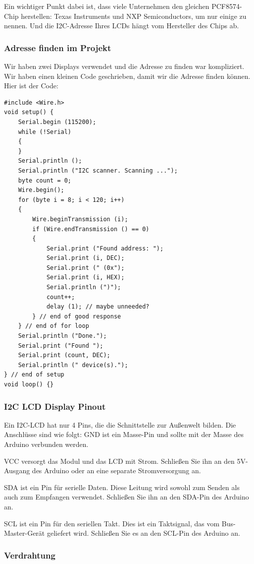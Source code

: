 \documentclass[conference]{IEEEtran}
\begin{document}
Ein wichtiger Punkt dabei ist, dass viele Unternehmen den gleichen PCF8574-Chip herstellen: Texas Instruments und NXP Semiconductors, um nur einige zu nennen. Und die I2C-Adresse Ihres LCDs hängt vom Hersteller des Chips ab.


\subsubsection{Adresse finden im Projekt}
Wir haben zwei  Displays verwendet und die Adresse zu finden war kompliziert.  Wir haben einen kleinen Code geschrieben, damit wir die Adresse finden können. Hier ist der Code: 

\begin{lstlisting}[style=CStyle]
#include <Wire.h>
void setup() {
	Serial.begin (115200);
	while (!Serial)
	{
	}
	Serial.println ();
	Serial.println ("I2C scanner. Scanning ...");
	byte count = 0;
	Wire.begin();
	for (byte i = 8; i < 120; i++)
	{
		Wire.beginTransmission (i);
		if (Wire.endTransmission () == 0)
		{
			Serial.print ("Found address: ");
			Serial.print (i, DEC);
			Serial.print (" (0x");
			Serial.print (i, HEX);
			Serial.println (")");
			count++;
			delay (1); // maybe unneeded?
		} // end of good response
	} // end of for loop
	Serial.println ("Done.");
	Serial.print ("Found ");
	Serial.print (count, DEC);
	Serial.println (" device(s).");
} // end of setup
void loop() {}
\end{lstlisting}\textbf{}

\subsubsection{I2C LCD Display Pinout}

Ein I2C-LCD hat nur 4 Pins, die die Schnittstelle zur Außenwelt bilden. Die Anschlüsse sind wie folgt:
GND ist ein Masse-Pin und sollte mit der Masse des Arduino verbunden werden.

VCC versorgt das Modul und das LCD mit Strom. Schließen Sie ihn an den 5V-Ausgang des Arduino oder an eine separate Stromversorgung an.

SDA ist ein Pin für serielle Daten. Diese Leitung wird sowohl zum Senden als auch zum Empfangen verwendet. Schließen Sie ihn an den SDA-Pin des Arduino an.

SCL ist ein Pin für den seriellen Takt. Dies ist ein Taktsignal, das vom Bus-Master-Gerät geliefert wird. Schließen Sie es an den SCL-Pin des Arduino an.

\subsubsection{Verdrahtung}
\end{document}
